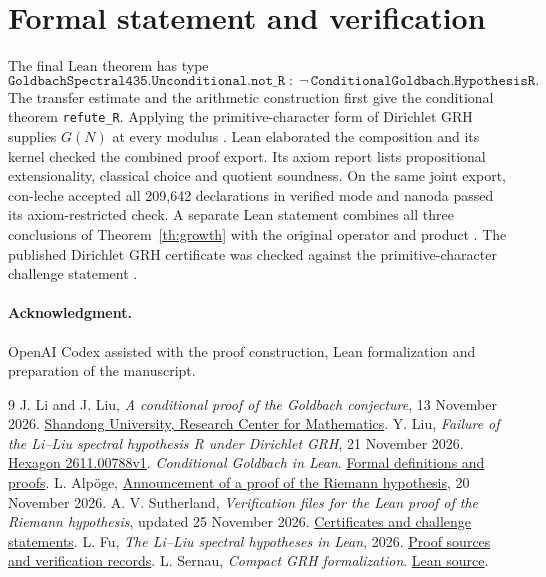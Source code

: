 \documentclass[11pt,a4paper]{article}
\begin{document}
\section*{Formal statement and verification}
The final Lean theorem has type
\[
                 \texttt{GoldbachSpectral435.Unconditional.not\_R}
                 \;:\; \neg\,\texttt{ConditionalGoldbach.HypothesisR}.
\]
The transfer estimate and the arithmetic construction first give the conditional theorem \texttt{refute\_R}. Applying the primitive-character form of Dirichlet GRH supplies $G(N)$ at every modulus \cite{compact}. Lean elaborated the composition and its kernel checked the combined proof export. Its axiom report lists propositional extensionality, classical choice and quotient soundness. On the same joint export, con-leche accepted all 209,642 declarations in verified mode and nanoda passed its axiom-restricted check. A separate Lean statement combines all three conclusions of Theorem~\ref{th:growth} with the original operator and product \cite{formal}. The published Dirichlet GRH certificate was checked against the primitive-character challenge statement \cite{grh,formal}.

\paragraph{Acknowledgment.} OpenAI Codex assisted with the proof construction, Lean formalization and preparation of the manuscript.

\begingroup\small
\begin{thebibliography}{9}
 J. Li and J. Liu, \emph{A conditional proof of the Goldbach conjecture}, 13 November 2026. \href{https://mrc.sdu.edu.cn/english/info/1018/1514.htm}{Shandong University, Research Center for Mathematics}.
 Y. Liu, \emph{Failure of the Li--Liu spectral hypothesis R under Dirichlet GRH}, 21 November 2026. \href{https://hexagonmath.org/2611.00788v1}{Hexagon 2611.00788v1}.
 \emph{Conditional Goldbach in Lean}. \href{https://github.com/subfish-zhou/conditional-goldbach-lean}{Formal definitions and proofs}.
 L. Alp\"oge, \href{https://alpo.ge/remark.pdf}{Announcement of a proof of the Riemann hypothesis}, 20 November 2026. A. V. Sutherland, \emph{Verification files for the Lean proof of the Riemann hypothesis}, updated 25 November 2026. \href{https://math.mit.edu/~drew/grh/}{Certificates and challenge statements}.
 L. Fu, \emph{The Li--Liu spectral hypotheses in Lean}, 2026.
\href{https://github.com/RaymondVoldemortFu/li-liu-spectral-hypotheses-lean}{Proof sources and verification records}.
 L. Sernau, \emph{Compact GRH formalization}.
\href{https://github.com/lsernau/grh-lean/tree/main/grh-compact}{Lean source}.
\end{thebibliography}
\endgroup
\end{document}
